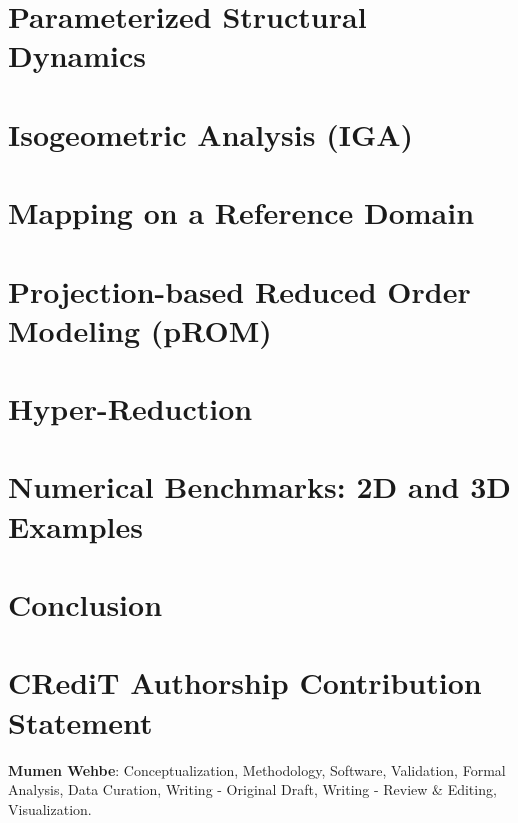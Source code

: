 \documentclass[final,5p,times,twocolumn]{elsarticle}
\begin{document}
\section{Parameterized Structural Dynamics}
\label{sec:parameterized_dynamics}


\section{Isogeometric Analysis (IGA)}
\label{sec:iga}


\section{Mapping on a Reference Domain}
\label{sec:ref_mapping}


\section{Projection-based Reduced Order Modeling (pROM)}
\label{sec:prom}


\section{Hyper-Reduction}
\label{sec:hyperreduction}


\section{Numerical Benchmarks: 2D and 3D Examples}
\label{sec:examples}


\section{Conclusion}
\label{sec:conclusion}


\section*{CRediT Authorship Contribution Statement}
\textbf{Mumen Wehbe}: Conceptualization, Methodology, Software, Validation, Formal Analysis, Data Curation, Writing - Original Draft, Writing - Review \& Editing, Visualization.
\end{document}
